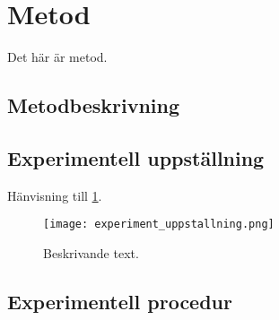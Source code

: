 \section{Metod} \label{s:metod}
%
Det här är metod.
\subsection{Metodbeskrivning}
\subsection{Experimentell uppställning}
Hänvisning till \cref{f:namn}.
\begin{figure} [H]
    \centering 
    \texttt{[image: experiment\_uppstallning.png]}
    \caption{Beskrivande text.}
    \label{f:namn}
\end{figure}
\subsection{Experimentell procedur}